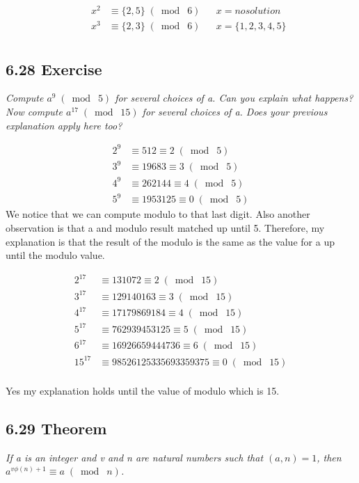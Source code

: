 \documentclass{article}
\begin{document}
\begin{align*}
    &&x^2 &\equiv \{2,5\} \;(\bmod\; 6)&& x = no solution\\
    &&x^3 &\equiv \{2,3\} \;(\bmod\; 6)&& x = \{1,2,3,4,5\}\\
\end{align*}

\subsection*{6.28 Exercise} 
\quad \textit{Compute $a^9 \;(\bmod\; 5)$ for several choices of a. Can you explain what happens? Now compute $a^{17} \;(\bmod\; 15)$ for several choices of a. Does your previous explanation apply here too?}

\begin{align*}
    &&2^9&\equiv 512 \equiv 2\;(\bmod\; 5)&&\\
    &&3^9&\equiv 19683 \equiv 3\;(\bmod\; 5)&&\\
    &&4^9&\equiv 262144 \equiv 4\;(\bmod\; 5)&&\\
    &&5^9&\equiv 1953125 \equiv 0\;(\bmod\; 5)&&
\end{align*}
We notice that we can compute modulo to that last digit. Also another observation is that a and modulo result matched up until 5. Therefore, my explanation is that the result of the modulo is the same as the value for a up until the modulo value.

\begin{align*}
    &&2^{17}&\equiv 131072 \equiv 2 \;(\bmod\; 15)&&\\
    &&3^{17}&\equiv 129140163 \equiv 3 \;(\bmod\; 15)&&\\
    &&4^{17}&\equiv 17179869184 \equiv 4 \;(\bmod\; 15)&&\\
    &&5^{17}&\equiv 762939453125 \equiv 5 \;(\bmod\; 15)&&\\
    &&6^{17}&\equiv 16926659444736 \equiv 6 \;(\bmod\; 15)&&\\
    &&15^{17}&\equiv 98526125335693359375 \equiv 0 \;(\bmod\; 15)&&\\
\end{align*}

Yes my explanation holds until the value of modulo which is 15.

\subsection*{6.29 Theorem} 
\quad \textit{If a is an integer and v and n are natural numbers such that $(a, n) = 1$, then $a^{v\phi{(n)}+1} \equiv  a \;(\bmod\; n)$.}
\end{document}
